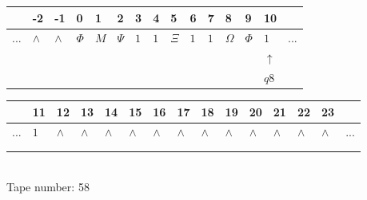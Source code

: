\documentclass[11pt]{article}
\begin{document}
\begin{table}[H]
\centering
\begin{tabular}{lllllllllllllll}
 & -2 & -1 & 0 & 1 & 2 & 3 & 4 & 5 & 6 & 7 & 8 & 9 & 10 & \\
\hline
$...$ & \multicolumn{1}{|l|}{$\wedge$} & \multicolumn{1}{|l|}{$\wedge$} & \multicolumn{1}{|l|}{$\Phi$} & \multicolumn{1}{|l|}{$M$} & \multicolumn{1}{|l|}{$\Psi$} & \multicolumn{1}{|l|}{$1$} & \multicolumn{1}{|l|}{$1$} & \multicolumn{1}{|l|}{$\Xi$} & \multicolumn{1}{|l|}{$1$} & \multicolumn{1}{|l|}{$1$} & \multicolumn{1}{|l|}{$\Omega$} & \multicolumn{1}{|l|}{$\Phi$} & \multicolumn{1}{|l|}{$1$} & $...$\\
\hline
&  &  &  &  &  &  &  &  &  &  &  &  & $\uparrow$ &  \\
&  &  &  &  &  &  &  &  &  &  &  &  & $ q8 $ &  \\
\end{tabular}
\begin{tabular}{lllllllllllllll}
 & 11 & 12 & 13 & 14 & 15 & 16 & 17 & 18 & 19 & 20 & 21 & 22 & 23 & \\
\hline
$...$ & \multicolumn{1}{|l|}{$1$} & \multicolumn{1}{|l|}{$\wedge$} & \multicolumn{1}{|l|}{$\wedge$} & \multicolumn{1}{|l|}{$\wedge$} & \multicolumn{1}{|l|}{$\wedge$} & \multicolumn{1}{|l|}{$\wedge$} & \multicolumn{1}{|l|}{$\wedge$} & \multicolumn{1}{|l|}{$\wedge$} & \multicolumn{1}{|l|}{$\wedge$} & \multicolumn{1}{|l|}{$\wedge$} & \multicolumn{1}{|l|}{$\wedge$} & \multicolumn{1}{|l|}{$\wedge$} & \multicolumn{1}{|l|}{$\wedge$} & $...$\\
\hline
&  &  &  &  &  &  &  &  &  &  &  &  &  &  \\
&  &  &  &  &  &  &  &  &  &  &  &  &  &  \\
\end{tabular}
\\
Tape number: 58
\noindent\makebox[\linewidth]{\hdashrule{\textwidth}{1pt}{1pt}}\end{table}
\end{document}
